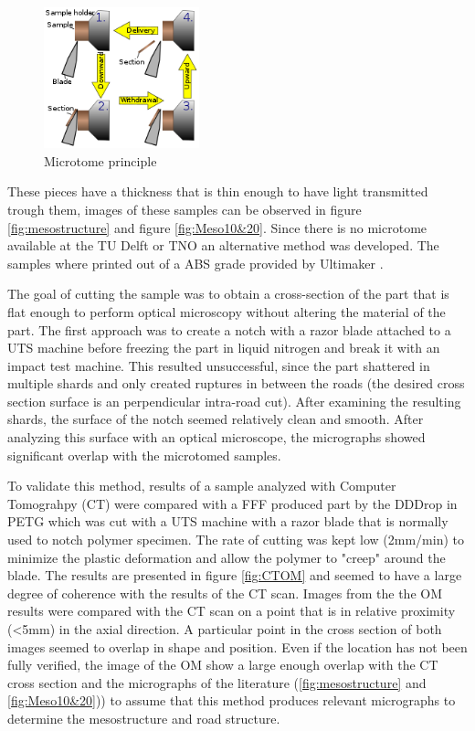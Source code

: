 \begin{figure}[H]
    \centering
    \includegraphics[width=0.40\textwidth]{chapter_4_RVE_Definition/figures/Microtomeprinciple.png}
    \caption{Microtome principle}
    \label{fig:Microtomeprinciple}
\end{figure}

These pieces have a thickness that is thin enough to have light transmitted trough them, images of these samples can be observed in figure \ref{fig:mesostructure} and figure \ref{fig:Meso10&20}. Since there is no microtome available at the TU Delft or TNO an alternative method was developed. The samples where printed out of a ABS grade provided by Ultimaker \cite{TechnicalUM}. 

The goal of cutting the sample was to obtain a cross-section of the part that is flat enough to perform optical microscopy without altering the material of the part. The first approach was to create a notch with a razor blade attached to a UTS machine before freezing the part in liquid nitrogen and break it with an impact test machine. This resulted unsuccessful, since the part shattered in multiple shards and only created ruptures in between the roads (the desired cross section surface is an perpendicular intra-road cut). After examining the resulting shards, the surface of the notch seemed relatively clean and smooth. After analyzing this surface with an optical microscope, the micrographs showed significant overlap with the microtomed samples. 

To validate this method, results of a sample analyzed with Computer Tomograhpy (CT) were compared with a FFF produced part by the DDDrop \cite{VeenEnhancingTemperature} in PETG which was cut with a UTS machine with a razor blade that is normally used to notch polymer specimen. The rate of cutting was kept low (2mm/min) to minimize the plastic deformation and allow the polymer to "creep" around the blade. The results are presented in figure \ref{fig:CTOM} and seemed to have a large degree of coherence with the results of the CT scan. Images from the the OM results were compared with the CT scan on a point that is in relative proximity (<5mm) in the axial direction. A particular point in the cross section of both images seemed to overlap in shape and position. Even if the location has not been fully verified, the image of the OM show a large enough overlap with the CT cross section and the micrographs of the literature (\ref{fig:mesostructure} and \ref{fig:Meso10&20})) to assume that this method produces relevant micrographs to determine the mesostructure and road structure.  

